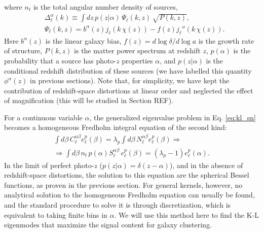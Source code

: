 \documentclass[twocolumn,amsfont,amssymb,amsmath, showpacs,balancelastpage, nofootinbib]{revtex4-1}
\begin{document}
    where $n_t$ is the total angular number density of sources,
    \begin{align}\nonumber
      &\Delta^{\alpha}_\ell(k)\equiv\int dz\,p(z|\alpha)\,\Psi_\ell(k,z)\,\sqrt{P(k,z)},\\\label{eq:tgc_dr}
      &\Psi_\ell(k,z)=b^\alpha(z)j_\ell(k\,\chi(z))-f(z)j_\ell''(k\,\chi(z)).
    \end{align}
    Here $b^\alpha(z)$ is the linear galaxy bias, $f(z)=d\log\delta/d\log a$ is the growth rate of structure, $P(k,z)$ is the matter power spectrum at redshift $z$, $p(\alpha)$ is the probability that a source has photo-$z$ properties $\alpha$, and $p(z|\alpha)$ is the conditional redshift distribution of these sources (we have labelled this quantity $\phi^\alpha(z)$ in previous sections). Note that, for simplicity, we have kept the contribution of redshift-space distortions at linear order and neglected the effect of magnification (this will be studied in Section REF).
    
    For a continuous variable $\alpha$, the generalized eigenvalue problem in Eq. \ref{eq:kl_sn} becomes a homogeneous Fredholm integral equation of the second kind:
    \begin{align}
      \int d\beta\,C^{\alpha\beta}_\ell e^p_\ell(\beta)=\lambda_p\int d\beta\,N^{\alpha\beta}_\ell e^p_\ell(\beta)\Rightarrow\\
      \Rightarrow\int d\beta\,n_t\,p(\alpha) S^{\alpha\beta}_\ell\,e^p_\ell(\beta)=(\lambda_p-1)e^p_\ell(\alpha).
    \end{align}
    In the limit of perfect photo-$z$ ($p(z|\alpha)=\delta(z-\alpha)$), and in the absence of redshift-space distortions, the solution to this equation are the spherical Bessel functions, as proven in the previous section. For general kernels, however, no analytical solution to the homogeneous Fredholm equation can usually be found, and the standard procedure to solve it is through discretization, which is equivalent to taking finite bins in $\alpha$. We will use this method here to find the K-L eigenmodes that maximize the signal content for galaxy clustering.
\end{document}
